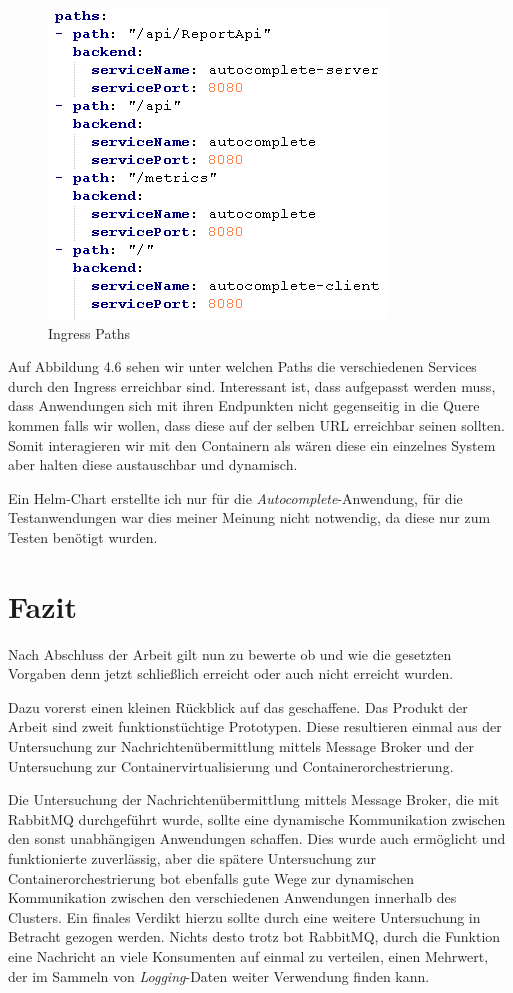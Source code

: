\documentclass[12pt,a4paper]{scrartcl}
\begin{document}
\begin{figure}[h!]
	\centering
	\includegraphics[scale=1]{KubeIngressPaths.png}
	\caption[Screenshot]{Ingress Paths}
\end{figure}

Auf Abbildung 4.6 sehen wir unter welchen Paths die verschiedenen Services durch den Ingress erreichbar sind. Interessant ist, dass aufgepasst werden muss, dass Anwendungen sich mit ihren Endpunkten nicht gegenseitig in die Quere kommen falls wir wollen, dass diese auf der selben URL erreichbar seinen sollten. 
Somit interagieren wir mit den Containern als wären diese ein einzelnes System aber halten diese austauschbar und dynamisch.

Ein Helm-Chart erstellte ich nur für die \emph{Autocomplete}-Anwendung, für die Testanwendungen war dies meiner Meinung nicht notwendig, da diese nur zum Testen benötigt wurden.


\newpage
\section{Fazit}\label{conclusion}
Nach Abschluss der Arbeit gilt nun zu bewerte ob und wie die gesetzten Vorgaben denn jetzt schließlich erreicht oder auch nicht erreicht wurden.

Dazu vorerst einen kleinen Rückblick auf das geschaffene. Das Produkt der Arbeit sind zweit funktionstüchtige Prototypen. Diese resultieren einmal aus der Untersuchung zur Nachrichtenübermittlung mittels Message Broker und der Untersuchung zur Containervirtualisierung und Containerorchestrierung. 

Die Untersuchung der Nachrichtenübermittlung mittels Message Broker, die mit RabbitMQ durchgeführt wurde, sollte eine dynamische Kommunikation zwischen den sonst unabhängigen Anwendungen schaffen. Dies wurde auch ermöglicht und funktionierte zuverlässig, aber die spätere Untersuchung zur Containerorchestrierung bot ebenfalls gute Wege zur dynamischen Kommunikation zwischen den verschiedenen Anwendungen innerhalb des Clusters. Ein finales Verdikt hierzu sollte durch eine weitere Untersuchung in Betracht gezogen werden. Nichts desto trotz bot RabbitMQ, durch die Funktion eine Nachricht an viele Konsumenten auf einmal zu verteilen, einen Mehrwert, der im Sammeln von \emph{Logging}-Daten weiter Verwendung finden kann.
\end{document}
